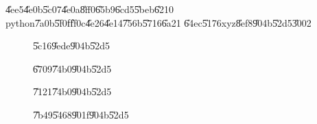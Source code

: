 \documentclass[12pt]{article}
\begin{document}
\U{4ee5}\U{4e0b}\U{5c07}\U{4e0a}\U{8ff0}\U{65b9}\U{6cd5}\U{5beb}\U{6210}%
python\U{7a0b}\U{5f0f}\U{ff0c}\U{4e26}\U{4e14}\U{756b}\U{5716}\U{6a21}%
\U{64ec}\U{5176}xyz\U{8ef8}\U{904b}\U{52d5}\U{3002}

\begin{figure}[th]
\caption{\U{5c16}\U{9ede}\U{904b}\U{52d5}}
\begin{center}
\end{center}
\end{figure}
\bigskip 

\begin{figure}[th]
\caption{\U{6709}\U{74b0}\U{904b}\U{52d5}}
\begin{center}
\end{center}
\end{figure}

\begin{figure}[th]
\caption{\U{7121}\U{74b0}\U{904b}\U{52d5}}
\begin{center}
\end{center}
\end{figure}

\begin{figure}[th]
\caption{\U{7b49}\U{5468}\U{901f}\U{904b}\U{52d5}}
\label{figure_uniform}
\begin{center}
\end{center}
\end{figure}
\end{document}
